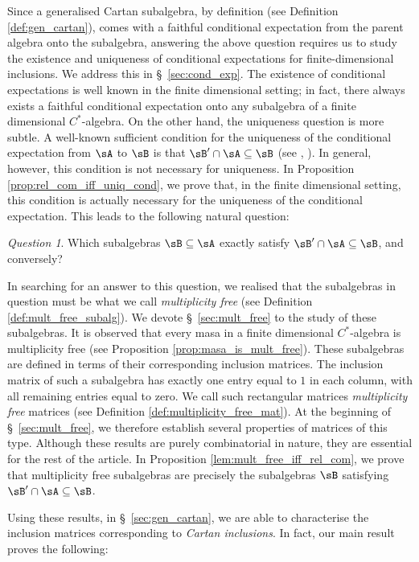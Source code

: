 \documentclass[12pt,a4paper]{amsart}
\theoremstyle{plain}
\theoremstyle{definition}
\theoremstyle{remark}
\numberwithin{equation}{section}
\theoremstyle{ser}
\theoremstyle{serr}
\theoremstyle{ser}
\theoremstyle{ser}
\newtheorem{qn}{Question}
\theoremstyle{collabquestion}
\newcommand{\<}{\langle}
\renewcommand{\>}{\rangle}
\begin{document}
Since a generalised Cartan subalgebra, by definition (see Definition \ref{def:gen_cartan}), comes with a faithful conditional expectation from the parent algebra onto the subalgebra, answering the above question requires us to study the existence and uniqueness of conditional expectations for finite-dimensional inclusions. We address this in \S~\ref{sec:cond_exp}. The existence of conditional expectations is well known in the finite dimensional setting; in fact, there always exists a faithful conditional expectation onto any subalgebra of a finite dimensional $C^*$-algebra. On the other hand, the uniqueness question is more subtle. A well-known sufficient condition for the uniqueness of the conditional expectation from $\sA$ to $\sB$ is that $\sB'\cap \sA \subseteq \sB$ (see \cite[Corollary 1.4.3]{watatani1990}, \cite[IX.4.3]{takesaki02}). In general, however, this condition is not necessary for uniqueness. In Proposition \ref{prop:rel_com_iff_uniq_cond}, we prove that, in the finite dimensional setting, this condition is actually necessary for the uniqueness of the conditional expectation. This leads to the following natural question:
\begin{qn}
Which subalgebras $\sB\subseteq \sA$ exactly satisfy $\sB'\cap \sA \subseteq \sB$, and conversely?
\end{qn}

In searching for an answer to this question, we realised that the subalgebras in question must be what we call \emph{multiplicity free} (see Definition \ref{def:mult_free_subalg}). We devote \S~\ref{sec:mult_free} to the study of these subalgebras. It is observed that every masa in a finite dimensional $C^*$-algebra is multiplicity free (see Proposition \ref{prop:masa_is_mult_free}). These subalgebras are defined in terms of their corresponding inclusion matrices. The inclusion matrix of such a subalgebra has exactly one entry equal to $1$ in each column, with all remaining entries equal to zero. We call such rectangular matrices \emph{multiplicity free} matrices (see Definition \ref{def:multiplicity_free_mat}). At the beginning of \S~\ref{sec:mult_free}, we therefore establish several properties of matrices of this type. Although these results are purely combinatorial in nature, they are essential for the rest of the article. In Proposition \ref{lem:mult_free_iff_rel_com}, we prove that multiplicity free subalgebras are precisely the subalgebras $\sB$ satisfying $\sB'\cap \sA \subseteq \sB$.

Using these results, in \S~\ref{sec:gen_cartan}, we are able to characterise the inclusion matrices corresponding to \emph{Cartan inclusions}. In fact, our main result proves the following:
\end{document}
